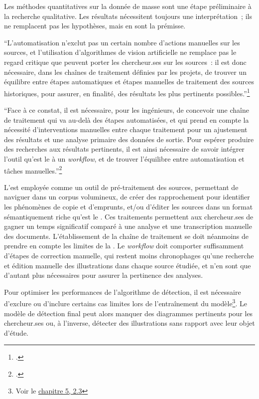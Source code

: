 Les méthodes quantitatives sur la donnée de masse sont une étape
préliminaire à la recherche qualitative. Les résultats nécessitent
toujours une interprétation~; ils ne remplacent pas les hypothèses, mais
en sont la prémisse.

\begin{kwote}
``L'automatisation n'exclut pas un certain nombre d'actions manuelles
sur les sources, et l'utilisation d'algorithmes de vision artificielle
ne remplace pas le regard critique que peuvent porter les chercheur.ses sur
les sources~: il est donc nécessaire, dans les chaînes de traitement
définies par les projets, de trouver un équilibre entre étapes
automatiques et étapes manuelles de traitement des sources historiques,
pour assurer, en finalité, des résultats les plus pertinents
possibles.''\footcite[p.70]{norindr_traitement_2023}
\end{kwote}

\begin{kwote}
``Face à ce constat, il est nécessaire, pour les ingénieurs, de
concevoir une chaîne de traitement qui va au-delà des étapes
automatisées, et qui prend en compte la nécessité d'interventions
manuelles entre chaque traitement pour un ajustement des résultats et
une analyse primaire des données de sortie. Pour espérer produire des
recherches aux résultats pertinents, il est ainsi nécessaire de savoir
intégrer l'outil qu'est le \dl à un \textit{workflow}, et de trouver
l'équilibre entre automatisation et tâches manuelles.''\footcite[p.70]{norindr_traitement_2023}
\end{kwote}

L'\ia est employée comme un outil de
pré-traitement des sources, permettant de naviguer dans un corpus
volumineux, de créer des rapprochement pour identifier les phénomènes de
copie et d'emprunts, et/ou d'éditer les sources dans un format
sémantiquement riche qu'est le \svg. Ces traitements permettent aux
chercheur.ses de gagner un temps significatif comparé à une analyse et une
transcription manuelle des documents. L'établissement de la chaîne de
traitement se doit néanmoins de prendre en compte les limites de la
\cv. Le \textit{workflow} doit comporter suffisamment d'étapes de
correction manuelle, qui restent moins chronophages qu'une recherche et
édition manuelle des illustrations dans chaque source étudiée, et
n'en sont que d'autant plus nécessaires pour assurer la pertinence des
analyses.

Pour optimiser les performances de l'algorithme de détection, il est
nécessaire d'exclure ou d'inclure certains cas limites lors de
l'entraînement du modèle\footnote{Voir le \hyperlink{loeil-de-la-machine-avantages-et-limites}{chapitre 5, 2.3}}. Le
modèle de détection final peut alors manquer des diagrammes pertinents
pour les chercheur.ses ou, à l'inverse, détecter des illustrations sans
rapport avec leur objet d'étude.

